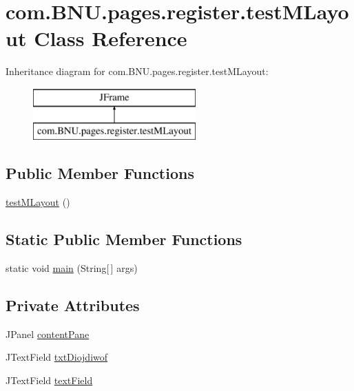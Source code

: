 \hypertarget{classcom_1_1_b_n_u_1_1pages_1_1register_1_1test_m_layout}{}\section{com.\+B\+N\+U.\+pages.\+register.\+test\+M\+Layout Class Reference}
\label{classcom_1_1_b_n_u_1_1pages_1_1register_1_1test_m_layout}
Inheritance diagram for com.\+B\+N\+U.\+pages.\+register.\+test\+M\+Layout\+:\begin{figure}[H]
\begin{center}
\leavevmode
\includegraphics[height=2.000000cm]{classcom_1_1_b_n_u_1_1pages_1_1register_1_1test_m_layout}
\end{center}
\end{figure}
\subsection*{Public Member Functions}
\begin{DoxyCompactItemize}
\item 
\mbox{\hyperlink{classcom_1_1_b_n_u_1_1pages_1_1register_1_1test_m_layout_a2083c250fa342ad87e320771c46bfefc}{test\+M\+Layout}} ()
\end{DoxyCompactItemize}
\subsection*{Static Public Member Functions}
\begin{DoxyCompactItemize}
\item 
static void \mbox{\hyperlink{classcom_1_1_b_n_u_1_1pages_1_1register_1_1test_m_layout_a6c24055e25f26785f7ceb9e5429834bc}{main}} (String\mbox{[}$\,$\mbox{]} args)
\end{DoxyCompactItemize}
\subsection*{Private Attributes}
\begin{DoxyCompactItemize}
\item 
J\+Panel \mbox{\hyperlink{classcom_1_1_b_n_u_1_1pages_1_1register_1_1test_m_layout_a570e64dbb72a7b1b02aaf9b717a896b9}{content\+Pane}}
\item 
J\+Text\+Field \mbox{\hyperlink{classcom_1_1_b_n_u_1_1pages_1_1register_1_1test_m_layout_ae1b4d8ce2e8e716ac29ac61a83945a99}{txt\+Diojdiwof}}
\item 
J\+Text\+Field \mbox{\hyperlink{classcom_1_1_b_n_u_1_1pages_1_1register_1_1test_m_layout_a36f48f567802742fd558c21166485297}{text\+Field}}
\end{DoxyCompactItemize}


